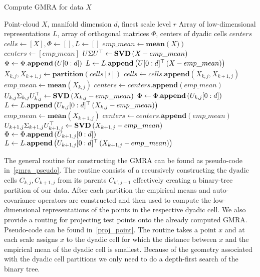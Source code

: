 \documentclass{article}
\begin{document}
  \begin{algorithm}[t]
    \caption{Compute GMRA for data $X$}
    \label{gmra_pseudo}
    \begin{algorithmic}
      \REQUIRE Point-cloud $X$, manifold dimension $d$, finest scale level $r$
      \ENSURE Array of low-dimensional representations $L$, array of orthogonal matrices $\Phi$, centers of dyadic cells $centers$
      \STATE $cells \leftarrow [X],\Phi \leftarrow [], L \leftarrow []$
      \STATE $emp\_mean \leftarrow \mathbf{mean}\left(X)\right)$
      \STATE $centers \leftarrow [emp\_mean]$
      \STATE ${U}\Sigma{U}^{\top} \leftarrow \mathbf{SVD}\left(X-emp\_mean\right)$
      \STATE $\Phi \leftarrow \Phi.\mathbf{append}\left({U}[0:d]\right)$
      \STATE $L \leftarrow L.\mathbf{append}\left({U}[0:d]^{\top}\left(X-emp\_mean\right)\right)$
      \STATE $X_{k,j},X_{k+1,j} \leftarrow \mathbf{partition}\left(cells[i]\right)$
      \STATE $cells \leftarrow cells.\mathbf{append}\left(X_{k,j},X_{k+1,j}\right)$
      \STATE $emp\_mean \leftarrow \mathbf{mean}\left(X_{k,j}\right)$
      \STATE $centers \leftarrow centers.\mathbf{append}\left(emp\_mean\right)$
      \STATE ${U}_{k,j}\Sigma_{k,j}{U}_{k,j}^{\top} \leftarrow \mathbf{SVD}\left(X_{k,j}-emp\_mean\right)$
      \STATE $\Phi \leftarrow \Phi.\mathbf{append}\left({U}_{k,j}[0:d]\right)$
      \STATE $L \leftarrow L.\mathbf{append}\left({U}_{k,j}[0:d]^{\top}\left(X_{k,j}-emp\_mean\right)\right)$
      \STATE $emp\_mean \leftarrow \mathbf{mean}\left(X_{k+1,j}\right)$
      \STATE $centers \leftarrow centers.\mathbf{append}\left(emp\_mean\right)$
      \STATE ${U}_{k+1,j}\Sigma_{k+1,j}{U}_{k+1,j}^{\top} \leftarrow \mathbf{SVD}\left(X_{k+1,j}-emp\_mean\right)$
      \STATE $\Phi \leftarrow \Phi.\mathbf{append}\left({U}_{k+1,j}[0:d]\right)$
      \STATE $L \leftarrow L.\mathbf{append}\left({U}_{k+1,j}[0:d]^{\top}\left(X_{k+1,j}-emp\_mean\right)\right)$
      \ENDFOR
    \end{algorithmic}
  \end{algorithm}
  The general routine for constructing the GMRA can be found as pseudo-code in~\ref{gmra_pseudo}. The routine consists of a recursively constructing the dyadic cells $C_{k,j},C_{k+1,j}$ from its parents $C_{k',j-1}$ effectively creating a binary-tree partition of our data. After each partition the empirical means and auto-covariance operators are constructed and then used to compute the low-dimensional representations of the points in the respective dyadic cell. We also provide a routing for projecting test points onto the already computed GMRA. Pseudo-code can be found in~\ref{proj_point}. The routine takes a point $x$ and at each scale assigns $x$ to the dyadic cell for which the distance between $x$ and the empirical mean of the dyadic cell is smallest. Because of the geometry associated with the dyadic cell partitions we only need to do a depth-first search of the binary tree.
\end{document}
